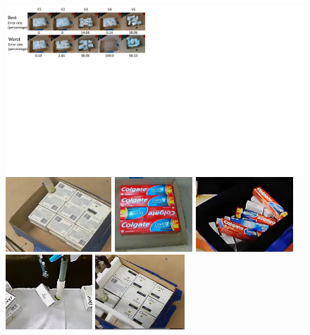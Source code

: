 \begin{figure}[ht]
\centering
  \includegraphics[width=1\textwidth]{Figures/final_packing.pdf}
  \includegraphics[height=1.1in]{Figures/two_layer.PNG}
  \includegraphics[height=1.1in]{Figures/toothpaste.png}
  \includegraphics[height=1.1in]{Figures/two_object}
  \includegraphics[height=1.1in]{Figures/flat_topple}
  \includegraphics[height=1.1in]{Figures/tight_packing}

\end{figure}
